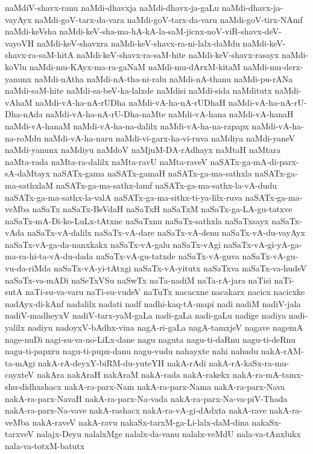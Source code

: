 {naMdiV-shavx-ranu
naMdi-dhavxja
naMdi-dhavx-ja-gaLu
naMdi-dhavx-ja-vayAyx
naMdi-goV-tarx-da-vara
naMdi-goV-tarx-da-varu
naMdi-goV-tirx-NAmf
naMdi-keVsha
naMdi-keV-sha-ma-hA-kA-la-saM-jicnx-noV-viR-shavx-deV-vayoVH
naMdi-keV-shavxra
naMdi-keV-shavx-ra-ni-lalx-daMdu
naMdi-keV-shavx-ra-saM-hitA
naMdi-keV-shavx-ra-saM-hite
naMdi-keV-shavx-rasayx
naMdi-koVlu
naMdi-mu-KAyx-ma-ra-gaNaM
naMdi-mu-dArxM-kitaM
naMdi-mu-derx-yanunx
naMdi-nAtha
naMdi-nA-tha-ni-ralu
naMdi-nA-thanu
naMdi-pu-rANa
naMdi-saM-hite
naMdi-sa-beV-ka-lalxde
naMdisi
naMdi-sida
naMditutx
naMdi-vAhaM
naMdi-vA-ha-nA-rUDha
naMdi-vA-ha-nA-rUDhaH
naMdi-vA-ha-nA-rU-Dha-nAda
naMdi-vA-ha-nA-rU-Dha-naMte
naMdi-vA-hana
naMdi-vA-hanaH
naMdi-vA-hanaM
naMdi-vA-ha-na-dalilx
naMdi-vA-ha-na-rapapx
naMdi-vA-ha-na-roMdu
naMdi-vA-ha-naru
naMdi-vi-garx-ha-vi-ruva
naMdiya
naMdi-yaneV
naMdi-yanunx
naMdiyu
naMdoV
naMjuM-DA-rAdhayx
naMtaH
naMtara
naMta-rada
naMta-ra-dalilx
naMta-ravU
naMta-raveV
naSATx-ga-mA-di-parx-sA-daMtayx
naSATx-gama
naSATx-gamaH
naSATx-ga-ma-sathxla
naSATx-ga-ma-sathxlaM
naSATx-ga-ma-sathx-lamf
naSATx-ga-ma-sathx-la-vA-dudu
naSATx-ga-ma-sathx-la-valA
naSATx-ga-ma-sithx-ti-ya-lilx-ruva
naSATx-ga-ma-veMba
naSaTx
naSaTx-BeVdaH
naSaTxH
naSaTxM
naSaTx-ga-LA-gu-tatxve
naSaTx-mA-Di-ko-LuLx-tAtxne
naSaTxnu
naSaTx-sathxla
naSaTxsayx
naSaTx-vAda
naSaTx-vA-dalilx
naSaTx-vA-dare
naSaTx-vA-denu
naSaTx-vA-du-vayAyx
naSaTx-vA-ga-da-nanxkakx
naSaTx-vA-galu
naSaTx-vAgi
naSaTx-vA-gi-yA-ga-ma-ra-hi-ta-vA-du-dada
naSaTx-vA-gu-tatxde
naSaTx-vA-guva
naSaTx-vA-gu-vu-da-riMda
naSaTx-vA-yi-tAtxgi
naSaTx-vA-yitutx
naSaTxva
naSaTx-va-hudeV
naSaTx-va-mADi
naSeTxVSu
naSwTx
naTa-nadiM
naTa-rA-jara
naTisi
naTi-sutA
naTi-su-va-varu
naTi-su-vudeV
naTuTx
nacacxne
nacakarx
nacicx
nacicxke
nadAyx-di-kAnf
nadalilx
nadati
nadf
nadhi-kaq-tA-mapi
nadi
nadiM
nadiV-jala
nadiV-madheyxV
nadiV-tarx-yaM-gaLa
nadi-gaLa
nadi-gaLu
nadige
nadiya
nadi-yalilx
nadiyu
nadoyxV-bAdhx-vina
nagA-ri-gaLa
nagA-tamxjeV
nagave
nagemA
nage-nuDi
nagi-su-va-no-LiLx-dane
nagu
naguta
nagu-ti-daRnu
nagu-ti-deRnu
nagu-ti-papxru
nagu-ti-pupx-danu
nagu-vudu
nahayxte
nahi
nahudu
nakA-rAM-ta-mAgi
nakA-rA-deyxY-biRM-du-yuteYH
nakA-rAdi
nakA-rA-kaSx-ra-mu-cayxteV
nakAra
nakAraH
nakAraM
nakA-rada
nakA-rakekx
nakA-ra-mA-tamx-shu-didhxshacx
nakA-ra-parx-Nam
nakA-ra-parx-Nama
nakA-ra-parx-Nava
nakA-ra-parx-NavaH
nakA-ra-parx-Na-vada
nakA-ra-parx-Na-va-piV-Thada
nakA-ra-parx-Na-vave
nakA-rashacx
nakA-ra-vA-gi-dAdxta
nakA-rave
nakA-ra-veMba
nakA-raveV
nakA-ravu
nakaSx-tarxM-ga-Li-lalx-daM-dina
nakaSx-tarxveV
nalajx-Deyu
nalalxMge
nalalx-da-vanu
nalalx-veMdU
nala-va-tAnxlukx
nala-va-totxM-batutx
}
